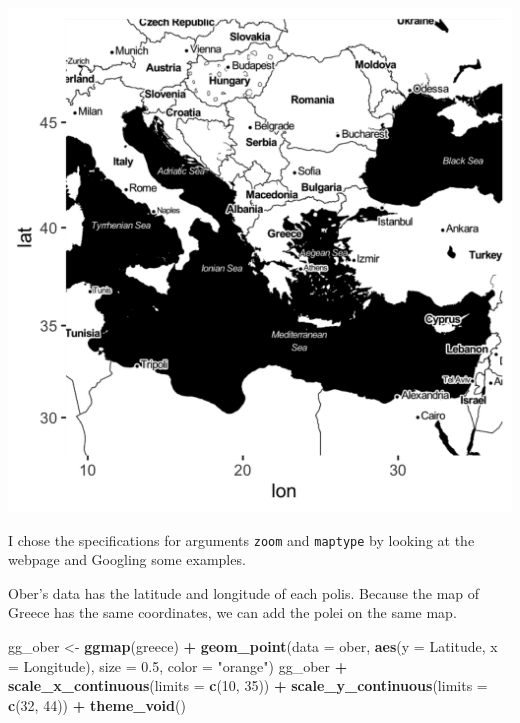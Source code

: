 \documentclass[]{book}
\newenvironment{Shaded}{\begin{snugshade}}{\end{snugshade}}
\newcommand{\DataTypeTok}[1]{\textcolor[rgb]{0.13,0.29,0.53}{#1}}
\newcommand{\DecValTok}[1]{\textcolor[rgb]{0.00,0.00,0.81}{#1}}
\newcommand{\FloatTok}[1]{\textcolor[rgb]{0.00,0.00,0.81}{#1}}
\newcommand{\KeywordTok}[1]{\textcolor[rgb]{0.13,0.29,0.53}{\textbf{#1}}}
\newcommand{\NormalTok}[1]{#1}
\newcommand{\OperatorTok}[1]{\textcolor[rgb]{0.81,0.36,0.00}{\textbf{#1}}}
\newcommand{\StringTok}[1]{\textcolor[rgb]{0.31,0.60,0.02}{#1}}
\theoremstyle{definition}
\theoremstyle{definition}
\theoremstyle{definition}
\theoremstyle{remark}
\begin{document}
\includegraphics{images/ober_ggmap_default.png}

I chose the specifications for arguments \texttt{zoom} and \texttt{maptype} by looking at the webpage and Googling some examples.

Ober's data has the latitude and longitude of each polis. Because the map of Greece has the same coordinates, we can add the polei on the same map.

\begin{Shaded}
\begin{Highlighting}[]
\NormalTok{gg_ober <-}\StringTok{ }\KeywordTok{ggmap}\NormalTok{(greece) }\OperatorTok{+}
\StringTok{  }\KeywordTok{geom_point}\NormalTok{(}\DataTypeTok{data =}\NormalTok{ ober, }
             \KeywordTok{aes}\NormalTok{(}\DataTypeTok{y =}\NormalTok{ Latitude, }\DataTypeTok{x =}\NormalTok{ Longitude), }
             \DataTypeTok{size =} \FloatTok{0.5}\NormalTok{,}
             \DataTypeTok{color =} \StringTok{"orange"}\NormalTok{)}
\NormalTok{gg_ober }\OperatorTok{+}\StringTok{ }
\StringTok{  }\KeywordTok{scale_x_continuous}\NormalTok{(}\DataTypeTok{limits =} \KeywordTok{c}\NormalTok{(}\DecValTok{10}\NormalTok{, }\DecValTok{35}\NormalTok{)) }\OperatorTok{+}\StringTok{ }
\StringTok{  }\KeywordTok{scale_y_continuous}\NormalTok{(}\DataTypeTok{limits =} \KeywordTok{c}\NormalTok{(}\DecValTok{32}\NormalTok{, }\DecValTok{44}\NormalTok{)) }\OperatorTok{+}
\StringTok{  }\KeywordTok{theme_void}\NormalTok{()}
\end{Highlighting}
\end{Shaded}
\end{document}
